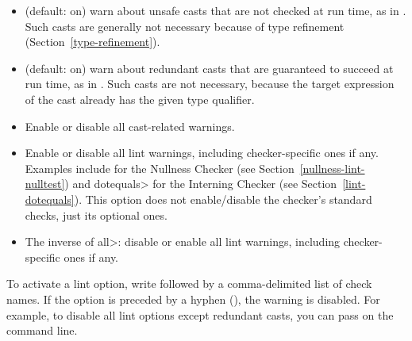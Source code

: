 


\begin{itemize}

\item
   (default: on) warn about unsafe casts that are not
  checked at run time, as in .  Such casts
  are generally not necessary because of type refinement
  (Section~\ref{type-refinement}).

\item
   (default: on) warn about redundant
  casts that are guaranteed to succeed at run time,
  as in .  Such casts are not necessary,
  because the target expression of the cast already has the given type
  qualifier.

\item
   Enable or disable all cast-related warnings.

\item
\begin{sloppypar}
   Enable or disable all lint warnings, including
  checker-specific ones if any.  Examples include  for the
  Nullness Checker (see Section~\ref{nullness-lint-nulltest}) and \<dotequals> for
  the Interning Checker (see Section~\ref{lint-dotequals}).  This option
  does not enable/disable the checker's standard checks, just its optional
  ones.
\end{sloppypar}

\item
   The inverse of \<all>:  disable or enable all lint warnings,
  including checker-specific ones if any.

\end{itemize}


\noindent
To activate a lint option, write  followed by a
comma-delimited list of check names.  If the option is preceded by a
hyphen (\code{-}), the warning is disabled.  For example, to disable all
lint options except redundant casts, you can pass
 on the command line.

